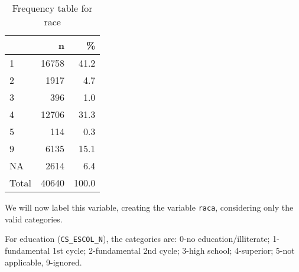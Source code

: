 \documentclass[
]{article}
\newenvironment{Shaded}{\begin{snugshade}}{\end{snugshade}}
\newcommand{\CommentTok}[1]{\textcolor[rgb]{0.56,0.35,0.01}{\textit{#1}}}
\newcommand{\DataTypeTok}[1]{\textcolor[rgb]{0.13,0.29,0.53}{#1}}
\newcommand{\DecValTok}[1]{\textcolor[rgb]{0.00,0.00,0.81}{#1}}
\newcommand{\KeywordTok}[1]{\textcolor[rgb]{0.13,0.29,0.53}{\textbf{#1}}}
\newcommand{\NormalTok}[1]{#1}
\newcommand{\OperatorTok}[1]{\textcolor[rgb]{0.81,0.36,0.00}{\textbf{#1}}}
\newcommand{\OtherTok}[1]{\textcolor[rgb]{0.56,0.35,0.01}{#1}}
\newcommand{\StringTok}[1]{\textcolor[rgb]{0.31,0.60,0.02}{#1}}
\begin{document}
\begin{table}[!h]

\caption{\label{tab:unnamed-chunk-24}Frequency table for race}
\centering
\begin{tabular}[t]{l|r|r}
\hline
  & n & \%\\
\hline
1 & 16758 & 41.2\\
\hline
2 & 1917 & 4.7\\
\hline
3 & 396 & 1.0\\
\hline
4 & 12706 & 31.3\\
\hline
5 & 114 & 0.3\\
\hline
9 & 6135 & 15.1\\
\hline
NA & 2614 & 6.4\\
\hline
Total & 40640 & 100.0\\
\hline
\end{tabular}
\end{table}

We will now label this variable, creating the variable \texttt{raca},
considering only the valid categories.

\begin{Shaded}
\end{Shaded}

For education (\texttt{CS\_ESCOL\_N}), the categories are: 0-no
education/illiterate; 1-fundamental 1st cycle; 2-fundamental 2nd cycle;
3-high school; 4-superior; 5-not applicable, 9-ignored.

\begin{Shaded}
\end{Shaded}
\end{document}

